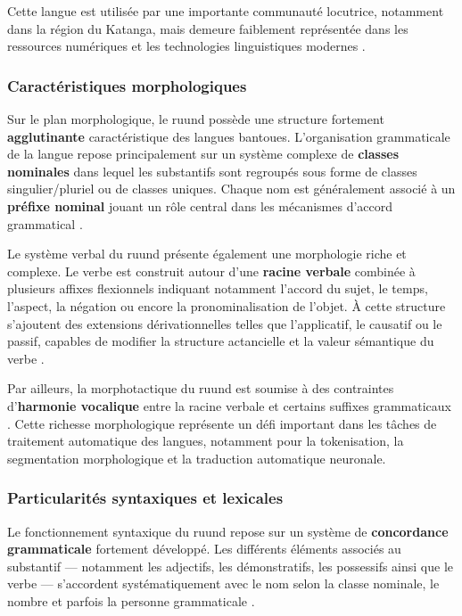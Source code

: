 Cette langue est utilisée par une importante communauté locutrice, notamment dans la région du Katanga, mais demeure faiblement représentée dans les ressources numériques et les technologies linguistiques modernes \cite{frwiki:199251041}.

\subsubsection{Caractéristiques morphologiques}

Sur le plan morphologique, le ruund possède une structure fortement \textbf{agglutinante} caractéristique des langues bantoues. L'organisation grammaticale de la langue repose principalement sur un système complexe de \textbf{classes nominales} dans lequel les substantifs sont regroupés sous forme de classes singulier/pluriel ou de classes uniques. Chaque nom est généralement associé à un \textbf{préfixe nominal} jouant un rôle central dans les mécanismes d'accord grammatical \cite{kawasha2003lunda}.

Le système verbal du ruund présente également une morphologie riche et complexe. Le verbe est construit autour d'une \textbf{racine verbale} combinée à plusieurs affixes flexionnels indiquant notamment l'accord du sujet, le temps, l'aspect, la négation ou encore la pronominalisation de l'objet. À cette structure s'ajoutent des extensions dérivationnelles telles que l'applicatif, le causatif ou le passif, capables de modifier la structure actancielle et la valeur sémantique du verbe \cite{kasombo2016structure, kawasha2003lunda}.

Par ailleurs, la morphotactique du ruund est soumise à des contraintes d'\textbf{harmonie vocalique} entre la racine verbale et certains suffixes grammaticaux \cite{kasombo2016structure}. Cette richesse morphologique représente un défi important dans les tâches de traitement automatique des langues, notamment pour la tokenisation, la segmentation morphologique et la traduction automatique neuronale.

\subsubsection{Particularités syntaxiques et lexicales}

Le fonctionnement syntaxique du ruund repose sur un système de \textbf{concordance grammaticale} fortement développé. Les différents éléments associés au substantif --- notamment les adjectifs, les démonstratifs, les possessifs ainsi que le verbe --- s'accordent systématiquement avec le nom selon la classe nominale, le nombre et parfois la personne grammaticale \cite{kawasha2003lunda}.

